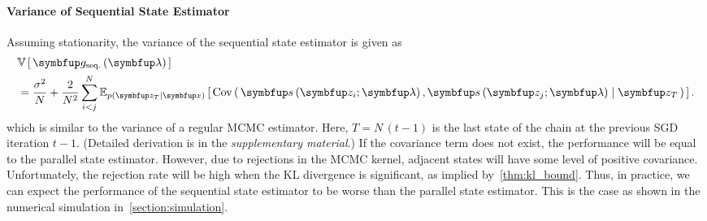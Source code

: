 \vspace{-0.05in}
\paragraph{Variance of Sequential State Estimator}
Assuming stationarity, the variance of the sequential state estimator is given as
%
\vspace{0.05in}
{
\begin{align}
  &\V{\vg_{\text{seq.}}\left(\vlambda\right)} \nonumber\\
  &= \frac{\sigma^2}{N} + \frac{2}{N^2} \sum_{i < j}^N \Esub{p\left(\vz_T \mid \vx \right)}{ \Cov{ \vs\left(\vz_{i};\vlambda\right), \vs\left(\vz_{j};\vlambda\right) \mid \vz_{T} } }\label{eq:var_seq}.
\end{align}
}
which is similar to the variance of a regular MCMC estimator.
Here, \(T = N\,\left(t - 1\right)\) is the last state of the chain at the previous SGD iteration \(t-1\).
(Detailed derivation is in the \textit{supplementary material}.)
If the covariance term does not exist, the performance will be equal to the parallel state estimator.
However, due to rejections in the MCMC kernel, adjacent states will have some level of positive covariance.
Unfortunately, the rejection rate will be high when the KL divergence is significant, as implied by~\cref{thm:kl_bound}.
Thus, in practice, we can expect the performance of the sequential state estimator to be worse than the parallel state estimator.
This is the case as shown in the numerical simulation in~\cref{section:simulation}.

%
%
%

%

